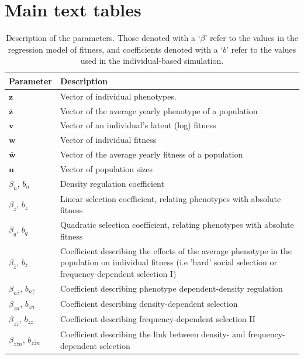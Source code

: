 \documentclass{article}
\begin{document}
	 
	
	
	\newpage
	\section{Main text tables}
	
	\begin{table} [h]	
		\begin{singlespace}
			
			\begin{tabular}{ l p{13cm}} 
				\hline			
				\textbf{Parameter} & \textbf{Description} \\ [2pt]
				\hline
				$\bm{z}$        & Vector of individual phenotypes. \\ [2pt]
				$\bar{\bm{z}}$  & Vector of the average yearly phenotype of a population\\ [2pt]
				$\bm{v}$        & Vector of an individual's latent (log) fitness \\ [2pt]
				$\bm{w}$        & Vector of individual fitness \\ [2pt]
				$\bar{\bm{w}}$  & Vector of the average yearly fitness of a population\\ [2pt]
				$\bm{n}$        & Vector of population sizes \\ [2pt]
				$\beta_n$, $b_n$              & Density regulation coefficient \\ [2pt]
				$\beta_z$, $b_z$              & Linear selection coefficient, relating phenotypes with absolute fitness \\ [2pt]
				$\beta_q$, $b_q$              & Quadratic selection coefficient, relating phenotypes with absolute fitness \\ [2pt]
				$\beta_{\bar{z}}$, $b_{\bar{z}}$       & Coefficient describing the effects of the average phenotype in the population on individual fitness (i.e 'hard' social selection or frequency-dependent selection I) \\ [2pt]
				$\beta_{n\bar{z}}$, $b_{n\bar{z}}$      & Coefficient describing phenotype dependent-density regulation \\ [2pt]
				$\beta_{zn}$, $b_{zn}$            & Coefficient describing density-dependent selection \\ 
				$\beta_{z\bar{z}}$, $b_{z\bar{z}}$      & Coefficient describing frequency-dependent selection II \\ [2pt]
				$\beta_{z\bar{z}n}$, $b_{z\bar{z}n}$    & Coefficient describing the link between density- and frequency-dependent selection\\ [2pt]
				\hline
			\end{tabular}
			\caption{Description of the parameters. Those denoted with a `$\beta$' refer to the values in the regression model of fitness, and coefficients denoted with a `$b$' refer to the values used in the individual-based simulation.}
		\end{singlespace}
	\end{table}
	
\end{document}
